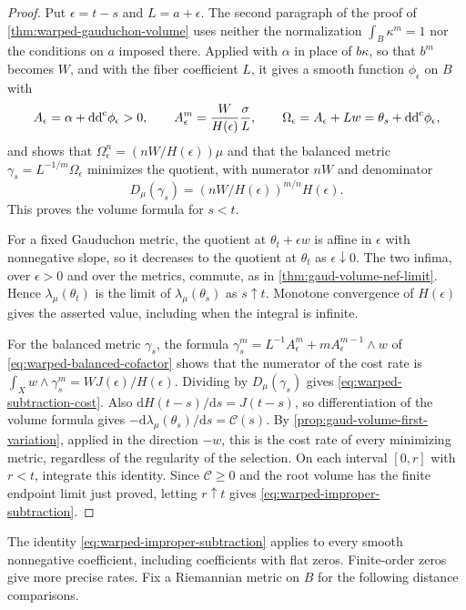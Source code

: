 \begin{proof}
Put $\epsilon=t-s$ and $L=a+\epsilon$. The second paragraph of the proof of \cref{thm:warped-gauduchon-volume} uses neither the normalization $\int_B\kappa^m=1$ nor the conditions on $a$ imposed there. Applied with $\alpha$ in place of $b\kappa$, so that $b^m$ becomes $W$, and with the fiber coefficient $L$, it gives a smooth function $\phi_\epsilon$ on $B$ with
\[
 A_\epsilon=\alpha+\mathrm{dd}^{\mathrm{c}}\phi_\epsilon>0,\qquad
 A_\epsilon^m=\frac{W}{H(\epsilon)}\frac{\sigma}{L},\qquad
 \Omega_\epsilon=A_\epsilon+Lw=\theta_s+\mathrm{dd}^{\mathrm{c}}\phi_\epsilon,
\]
and shows that $\Omega_\epsilon^n=(nW/H(\epsilon))\mu$ and that the balanced metric $\gamma_s=L^{-1/m}\Omega_\epsilon$ minimizes the quotient, with numerator $nW$ and denominator
\[
 D_\mu(\gamma_s)=(nW/H(\epsilon))^{m/n}H(\epsilon).
\]
This proves the volume formula for $s<t$.

For a fixed Gauduchon metric, the quotient at $\theta_t+\epsilon w$ is affine in $\epsilon$ with nonnegative slope, so it decreases to the quotient at $\theta_t$ as $\epsilon\downarrow0$. The two infima, over $\epsilon>0$ and over the metrics, commute, as in \cref{thm:gaud-volume-nef-limit}. Hence $\lambda_\mu(\theta_t)$ is the limit of $\lambda_\mu(\theta_s)$ as $s\uparrow t$. Monotone convergence of $H(\epsilon)$ gives the asserted value, including when the integral is infinite.

For the balanced metric $\gamma_s$, the formula $\gamma_s^m=L^{-1}A_\epsilon^m+mA_\epsilon^{m-1}\wedge w$ of \eqref{eq:warped-balanced-cofactor} shows that the numerator of the cost rate is $\int_Xw\wedge\gamma_s^m=WJ(\epsilon)/H(\epsilon)$. Dividing by $D_\mu(\gamma_s)$ gives \eqref{eq:warped-subtraction-cost}. Also $\mathrm{d}H(t-s)/\mathrm{d}s=J(t-s)$, so differentiation of the volume formula gives $-\mathrm{d}\lambda_\mu(\theta_s)/\mathrm{d}s=\mathcal C(s)$. By \cref{prop:gaud-volume-first-variation}, applied in the direction $-w$, this is the cost rate of every minimizing metric, regardless of the regularity of the selection. On each interval $[0,r]$ with $r<t$, integrate this identity. Since $\mathcal C\geq0$ and the root volume has the finite endpoint limit just proved, letting $r\uparrow t$ gives \eqref{eq:warped-improper-subtraction}.
\end{proof}

The identity \eqref{eq:warped-improper-subtraction} applies to every smooth nonnegative coefficient, including coefficients with flat zeros. Finite-order zeros give more precise rates. Fix a Riemannian metric on $B$ for the following distance comparisons.

